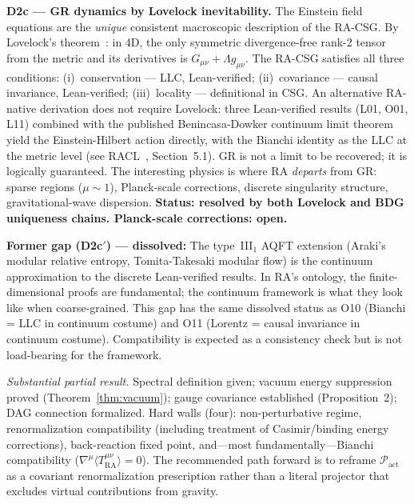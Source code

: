 \documentclass[11pt,a4paper]{article}
\theoremstyle{plain}
\theoremstyle{definition}
\theoremstyle{remark}
\newcommand{\Pact}{\mathcal{P}_{\mathrm{act}}}
\newcommand{\Tact}{T^{\mu\nu}_{\mathrm{RA}}}
\begin{document}
\begin{description}
  \textbf{D2c --- GR dynamics by Lovelock inevitability.} The Einstein
  field equations are the \emph{unique} consistent macroscopic description
  of the RA-CSG. By Lovelock's theorem~\citep{Lovelock1971}: in 4D, the
  only symmetric divergence-free rank-2 tensor from the metric and its
  derivatives is $G_{\mu\nu} + \Lambda g_{\mu\nu}$. The RA-CSG satisfies all
  three conditions: (i)~conservation --- LLC, Lean-verified; (ii)~covariance
  --- causal invariance, Lean-verified; (iii)~locality --- definitional in CSG.
  An alternative RA-native derivation does not require Lovelock: three
  Lean-verified results (L01, O01, L11) combined with the published
  Benincasa-Dowker continuum limit theorem yield the Einstein-Hilbert action
  directly, with the Bianchi identity as the LLC at the metric level (see
  RACL~\citep{Sandeman2026RACL}, Section~5.1).
  GR is not a limit to be recovered; it is logically guaranteed. The
  interesting physics is where RA \emph{departs} from GR: sparse regions
  ($\mu \sim 1$), Planck-scale corrections, discrete singularity structure,
  gravitational-wave dispersion. \textbf{Status: resolved by both Lovelock
  and BDG uniqueness chains. Planck-scale corrections: open.}

  \textbf{Former gap (D2c$'$) --- dissolved:} The type~III$_1$ AQFT
  extension (Araki's modular relative entropy, Tomita-Takesaki modular
  flow) is the continuum approximation to the discrete Lean-verified
  results. In RA's ontology, the finite-dimensional proofs are
  fundamental; the continuum framework is what they look like when
  coarse-grained. This gap has the same dissolved status as O10
  (Bianchi = LLC in continuum costume) and O11 (Lorentz = causal
  invariance in continuum costume). Compatibility is expected as a
  consistency check but is not load-bearing for the framework.

  \item[Derivation 3 ($\Pact$ Type-Constraint).] \textit{Substantial partial result.}
  Spectral definition given; vacuum energy suppression proved
  (Theorem~\ref{thm:vacuum}); gauge covariance established (Proposition~2); DAG
  connection formalized. Hard walls (four): non-perturbative regime, renormalization
  compatibility (including treatment of Casimir/binding energy corrections),
  back-reaction fixed point, and---most fundamentally---Bianchi compatibility
  ($\nabla^{\mu}\langle\Tact\rangle = 0$). The recommended path forward is to
  reframe $\Pact$ as a covariant renormalization prescription rather than a
  literal projector that excludes virtual contributions from gravity.



\end{description}
\end{document}
